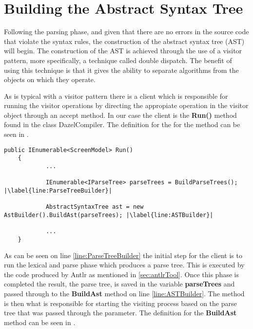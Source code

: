 \section{Building the Abstract Syntax Tree}

Following the parsing phase, and given that there are no errors in the source code that violate the syntax rules, the construction of the abstract syntax tree (AST) will begin. The construction of the AST is achieved through the use of a visitor pattern, more specifically, a technique called double dispatch. The benefit of using this technique is that it gives the ability to separate algorithms from the objects on which they operate\cite{VisitorGuru}. 

As is typical with a visitor pattern there is a client which is responsible for running the visitor operations by directing the appropiate operation in the visitor object through an accept method. In our case the client is the \textbf{Run()} method found in the class DazelCompiler. The definition for the for the method can be seen in .

\begin{lstlisting}[caption={The Run method that serves as a client inside the DazelCompiler class}, label={lst:RunMethod},escapechar=|]
    public IEnumerable<ScreenModel> Run()
    {
            ...

            IEnumerable<IParseTree> parseTrees = BuildParseTrees(); |\label{line:ParseTreeBuilder}|

            AbstractSyntaxTree ast = new AstBuilder().BuildAst(parseTrees); |\label{line:ASTBuilder}|

            ...
    }
\end{lstlisting}

As can be seen on line \ref{line:ParseTreeBuilder} the initial step for the client is to run the lexical and parse phase which produces a parse tree. This is executed by the code produced by Antlr as mentioned in \ref{sec:antlrTool}. Once this phase is completed the result, the parse tree, is saved in the variable \textbf{parseTrees} and passed through to the \textbf{BuildAst} method on line \ref{line:ASTBuilder}. 
The method is then what is responsible for starting the visiting process based on the parse tree that was passed through the parameter. The definition for the \textbf{BuildAst} method can be seen in .

